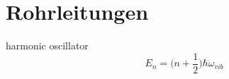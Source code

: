 \section{Rohrleitungen}
\label{sec:tubes}




harmonic oscillator
\begin{equation} \label{eq:harmonicoszillator}
E_n = \Biggl(n+\frac{1}{2} \Biggr)\hbar\omega_{vib}
\end{equation}
